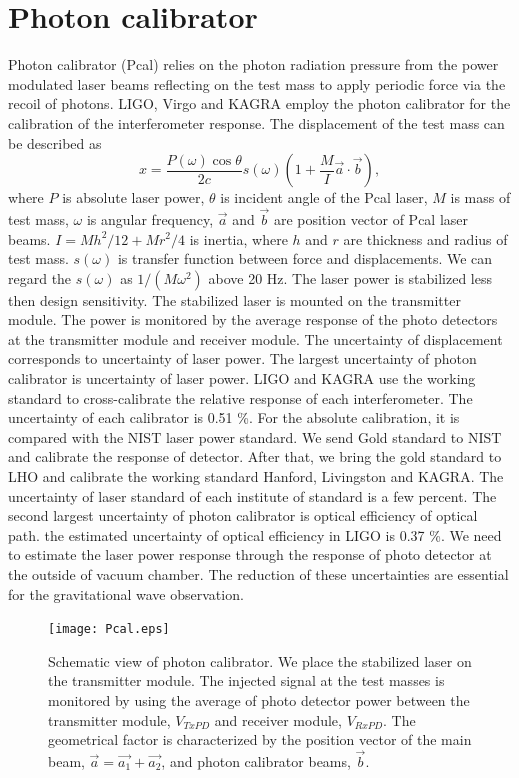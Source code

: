 \documentclass[12pt]{iopart}
\begin{document}
\section{Photon calibrator}
Photon calibrator (Pcal) relies on the photon radiation pressure from the power modulated laser beams reflecting on the test mass to apply periodic force via the recoil of photons. 
LIGO, Virgo and KAGRA employ the photon calibrator for the calibration of the interferometer response. The displacement of the test mass can be described as
\begin{equation}
 x = \frac{P(\omega) \cos{\theta}}{2c} s(\omega)\left(1+\frac{M}{I}\vec{a} \cdot \vec{b} \right) , \label{pcal}
\end{equation}
where $P$ is absolute laser power, $\theta$ is incident angle of the Pcal laser, $M$ is mass of test mass, $\omega$ is angular frequency, $\vec{a}$ and $\vec{b}$ are position vector of Pcal laser beams. $I=Mh^2/12+Mr^2/4$ is inertia, where $h$ and  $r$ are thickness and radius of test mass. $s(\omega)$ is transfer function between force and displacements. We can regard the $s(\omega)$ as $1/(M \omega^2)$ above 20 Hz. The laser power is stabilized less then design sensitivity. The stabilized laser is mounted on the transmitter module. The power is monitored by the average response of the photo detectors at the transmitter module and receiver module.  The uncertainty of displacement corresponds to uncertainty of laser power. 
The largest uncertainty of photon calibrator is uncertainty of laser power.
LIGO and KAGRA use the working standard to cross-calibrate the relative response of each interferometer. The uncertainty of  each  calibrator is 0.51 \%. For the absolute calibration, it is compared with the NIST laser power standard. We send Gold standard to NIST and calibrate the response of detector. After that, we bring the gold standard to LHO and calibrate the working standard Hanford, Livingston and KAGRA. The uncertainty of laser standard of each institute of standard is a few percent. 
The second largest uncertainty of photon calibrator is optical efficiency of optical path. the estimated uncertainty of optical efficiency in LIGO is 0.37 \%. We need to estimate the laser power response through the response of photo detector at the outside of vacuum chamber. 
The reduction of these uncertainties are essential for the gravitational wave observation.

\begin{figure}
\begin{center}
\texttt{[image: Pcal.eps]}
\caption{Schematic view of photon calibrator. We place the stabilized laser on the transmitter module. The injected signal at the test masses is monitored by using the average of photo detector power between the transmitter module, $V_{TxPD}$ and  receiver module, $V_{RxPD}$.  The geometrical factor is characterized by the position vector of the main beam, $\vec{a}=\vec{a_1}+\vec{a_2}$, and photon calibrator beams, $\vec{b}$.}
\label{fig:Pcal}
\end{center}
\end{figure}
\end{document}
